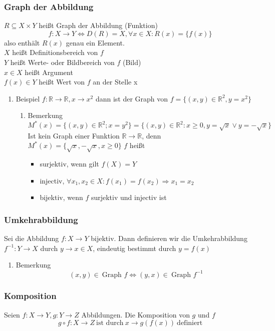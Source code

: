 \documentclass[11pt]{article}
\DeclareMathOperator{\Forall}{\forall}%
\begin{document}
\subsubsection{Graph der Abbildung}
\label{sec-2-3-2}
$R\subseteq X\times Y$ heißt Graph der Abbildung (Funktion) \[f:X\rightarrow Y \Leftrightarrow D(R) = X, \Forall x\in X: R(x) = \{f(x)\}\]
also enthält $R(x)$ genau ein Element. \\
    $X$ heißt Definitionsbereich von $f$ \\
    $Y$ heißt Werte- oder Bildbereich von $f$ (Bild) \\
    $x\in X$ heißt Argument \\
    $f(x)\in Y$ heißt Wert von $f$ an der Stelle x
\begin{enumerate}
\item Beispiel
\label{sec-2-3-2-1}
$f: \mathbb{R}\rightarrow\mathbb{R}, x\rightarrow x^2$ dann ist der Graph von $f = \{(x,y)\in\mathbb{R}^2, y=x^2\}$
\begin{enumerate}
\item Bemerkung
\label{sec-2-3-2-1-1}
\[M^{*}(x) = \{(x,y)\in\mathbb{R}^2;x=y^2\} = \{(x,y)\in\mathbb{R}^2: x \geq 0, y=\sqrt{x} \vee y = -\sqrt{x}\}\]
Ist kein Graph einer Funktion $\mathbb{R}\rightarrow\mathbb{R}$, denn $M^{ *}(x) = \{\sqrt{x},-\sqrt{x}, x\geq 0\}$
$f$ heißt
\begin{itemize}
\item surjektiv, wenn gilt $f(X) = Y$
\item injectiv, $\Forall x_1,x_2\in X: f(x_1) = f(x_2) \Rightarrow x_1 = x_2$
\item bijektiv, wenn $f$ surjektiv und injectiv ist
\end{itemize}
\end{enumerate}
\end{enumerate}
\subsubsection{Umkehrabbildung}
\label{sec-2-3-3}
Sei die Abbildung $f: X\rightarrow Y$ bijektiv. Dann definieren wir die Umkehrabbildung $f^{-1}:Y\rightarrow X$ durch $y\rightarrow x\in X$, eindeutig bestimmt durch $y = f(x)$
\begin{enumerate}
\item Bemerkung
\label{sec-2-3-3-1}
\[(x,y) \in~\text{Graph }f\Leftrightarrow (y,x)\in~\text{Graph }f^{-1}\]
\end{enumerate}
\subsubsection{Komposition}
\label{sec-2-3-4}
Seien $f:X\rightarrow Y, g:Y\rightarrow Z$ Abbildungen. Die Komposition von $g$ und $f$ \[g\circ f: X\rightarrow Z~\text{ist durch}~x\rightarrow g(f(x))~\text{definiert}\]
\end{document}
